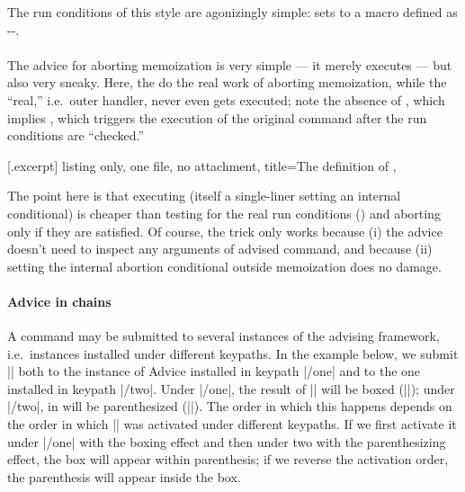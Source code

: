 \documentclass[a4paper,11pt]{article}
\begin{document}
The run conditions of this style are agonizingly simple:  sets  to a macro defined as
\hyp{}\hyp{}.

\paragraph{}

The advice for aborting memoization is very simple --- it merely executes
 --- but also very sneaky.  Here, the  do the real work of aborting memoization, while the ``real,''
i.e.\ outer handler, never even gets executed; note the absence of
, which implies , which triggers
the execution of the original command after the run conditions are ``checked.''

[.excerpt]{%
  listing only, one file, no attachment,
  title={The definition of },
}

The point here is that executing  (itself a single-liner
setting an internal conditional) is cheaper than testing for the real run
conditions () and aborting only if they are
satisfied.  Of course, the trick only works because (i) the advice doesn't
need to inspect any arguments of advised command, and because (ii) setting the
internal abortion conditional outside memoization does no damage.

\paragraph{Advice in chains}

A command may be submitted to several instances of the advising framework,
i.e.\ instances installed under different keypaths.  In the example below, we
submit |\foo| both to the instance of Advice installed in keypath |/one| and to
the one installed in keypath |/two|.  Under |/one|, the result of ||
will be boxed (|\fboxWrap|); under |/two|, in will be parenthesized
(|\parenWrap|).  The order in which this happens depends on the order in which
|\foo| was activated under different keypaths.  If we first activate it under
|/one| with the boxing effect and then under two with the parenthesizing
effect, the box will appear within parenthesis; if we reverse the activation
order, the parenthesis will appear inside the box.
\end{document}

